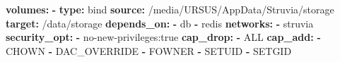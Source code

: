 \documentclass[
  10pt,
]{article}
\newenvironment{Shaded}{\begin{snugshade}}{\end{snugshade}}
\newcommand{\AttributeTok}[1]{\textcolor[rgb]{0.13,0.29,0.53}{#1}}
\newcommand{\FunctionTok}[1]{\textcolor[rgb]{0.13,0.29,0.53}{\textbf{#1}}}
\newcommand{\KeywordTok}[1]{\textcolor[rgb]{0.13,0.29,0.53}{\textbf{#1}}}
\begin{document}
\begin{Shaded}
\begin{Highlighting}[]
\AttributeTok{    }\FunctionTok{volumes}\KeywordTok{:}
\AttributeTok{      }\KeywordTok{{-}}\AttributeTok{ }\FunctionTok{type}\KeywordTok{:}\AttributeTok{ bind}
\AttributeTok{        }\FunctionTok{source}\KeywordTok{:}\AttributeTok{ /media/URSUS/AppData/Struvia/storage}
\AttributeTok{        }\FunctionTok{target}\KeywordTok{:}\AttributeTok{ /data/storage}
\AttributeTok{    }\FunctionTok{depends\_on}\KeywordTok{:}
\AttributeTok{      }\KeywordTok{{-}}\AttributeTok{ db}
\AttributeTok{      }\KeywordTok{{-}}\AttributeTok{ redis}
\AttributeTok{    }\FunctionTok{networks}\KeywordTok{:}
\AttributeTok{      }\KeywordTok{{-}}\AttributeTok{ struvia}
\AttributeTok{    }\FunctionTok{security\_opt}\KeywordTok{:}
\AttributeTok{      }\KeywordTok{{-}}\AttributeTok{ no{-}new{-}privileges:true}
\AttributeTok{    }\FunctionTok{cap\_drop}\KeywordTok{:}
\AttributeTok{      }\KeywordTok{{-}}\AttributeTok{ ALL}
\AttributeTok{    }\FunctionTok{cap\_add}\KeywordTok{:}
\AttributeTok{      }\KeywordTok{{-}}\AttributeTok{ CHOWN}
\AttributeTok{      }\KeywordTok{{-}}\AttributeTok{ DAC\_OVERRIDE}
\AttributeTok{      }\KeywordTok{{-}}\AttributeTok{ FOWNER}
\AttributeTok{      }\KeywordTok{{-}}\AttributeTok{ SETUID}
\AttributeTok{      }\KeywordTok{{-}}\AttributeTok{ SETGID}


\end{Highlighting}
\end{Shaded}
\end{document}
